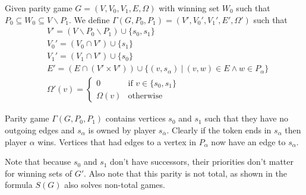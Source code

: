 \begin{definition}
	\label{def_gamma_games}
	Given parity game $G=(V,V_0,V_1,E,\Omega)$ with winning set $W_0$ such that $P_0 \subseteq W_0 \subseteq V \backslash P_1$. We define $\Gamma(G,P_0,P_1) = (V',V_0',V_1',E',\Omega')$ such that
	\begin{align*}
	&V' = (V \backslash P_0 \backslash P_1) \cup \{s_0,s_1\}\\
	&V_0' = (V_0 \cap V') \cup \{s_1\}\\
	&V_1' = (V_1 \cap V') \cup \{s_0\}\\
	&E' = (E \cap (V' \times V')) \cup \{ (v,s_\alpha)\ |\ (v,w) \in E \wedge w \in P_\alpha \}\\
	&\Omega'(v) = \begin{cases}0 & \text{if } v\in \{s_0,s_1\}\\
	\Omega(v) & \text{otherwise}\end{cases}
	\end{align*}
\end{definition}
Parity game $\Gamma(G,P_0,P_1)$ contains vertices $s_0$ and $s_1$ such that they have no outgoing edges and $s_\alpha$ is owned by player $s_{\overline{\alpha}}$. Clearly if the token ends in $s_\alpha$ then player $\alpha$ wins. Vertices that had edges to a vertex in $P_\alpha$ now have an edge to $s_\alpha$. 

Note that because $s_0$ and $s_1$ don't have successors, their priorities don't matter for winning sets of $G'$. Also note that this parity is not total, as shown in \cite{WALUKIEWICZ2002311} the formula $S(G)$ also solves non-total games.

